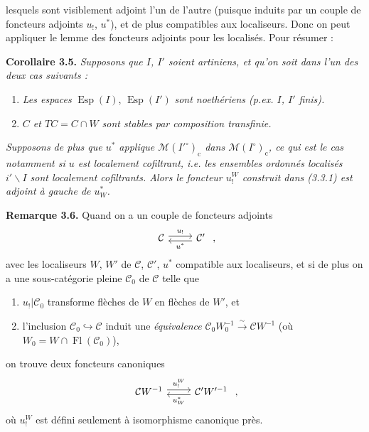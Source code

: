 \documentclass[11pt]{article}
\newcommand{\printedpage}[1]{\marginpar{\footnotesize p.~#1}}
\newcommand{\msp}[1]{\marginpar{\footnotesize [#1]}}
\newcommand{\Esp}{\operatorname{Esp}}
\newcommand{\Fl}{\operatorname{Fl}}
\newcommand{\M}{\mathcal{M}}
\begin{document}
\printedpage{29}
lesquels sont visiblement adjoint l'un de l'autre (puisque induits par un couple de foncteurs %
adjoints $u_!$, $u^*$), et de plus compatibles aux localiseurs. Donc on peut appliquer le lemme des foncteurs adjoints pour les localisés. Pour résumer :

\textbf{Corollaire 3.5.} \textit{Supposons que $I$, $I'$ soient artiniens, et qu'on soit dans l'un des deux cas suivants :}
\begin{enumerate}
\item[a)] \textit{Les espaces} $\Esp(I)$, $\Esp(I')$ \textit{sont noethériens (p.ex. $I$, $I'$ finis).}
\msp{page 58}
\item[b)] \textit{$C$ et $TC = C\cap W$ sont stables par composition transfinie.}
\end{enumerate}
\textit{Supposons de plus que $u^*$ applique $\M(I'^\circ)_{\mathrm{c}}$ dans $\M(I^\circ)_{\mathrm{c}}$, ce qui est le cas notamment si $u$ est localement cofiltrant, i.e. les ensembles ordonnés localisés $i'\backslash I$ sont localement cofiltrants. Alors le foncteur $u_!^W$ construit dans (3.3.1) est adjoint à gauche de $u_W^*$.}

\textbf{Remarque 3.6.} Quand on a un couple de foncteurs adjoints
\[
\begin{tikzcd}
\mathcal{C} \arrow[r, shift left, "u_!"] & \mathcal{C}' \arrow[l, shift left, "u^*"]
\end{tikzcd}
\ ,
\]
avec les localiseurs $W$, $W'$ de $\mathcal{C}$, $\mathcal{C}'$, $u^*$ compatible aux localiseurs, et si de plus on a une sous-catégorie pleine $\mathcal{C}_0$ de $\mathcal{C}$ telle que
\begin{enumerate}
\item[a)] $u_!|\mathcal{C}_0$ transforme flèches de $W$ en flèches de $W'$, et
\item[b)] l'inclusion $\mathcal{C}_0 \hookrightarrow \mathcal{C}$ induit une \textit{équivalence} $\mathcal{C}_0W_0^{-1} \xrightarrow{\sim} \mathcal{C}W^{-1}$ (où $W_0 = W\cap\Fl(\mathcal{C}_0)$),
\end{enumerate}
on trouve deux foncteurs canoniques
\[
\begin{tikzcd}
\mathcal{C}W^{-1} \arrow[r, shift left, "u_!^W"] & \mathcal{C}'W'^{-1} \arrow[l, shift left, "u_W^*"]
\end{tikzcd}
\ ,
\]
où $u_!^W$ est défini seulement à isomorphisme canonique près.
\end{document}
